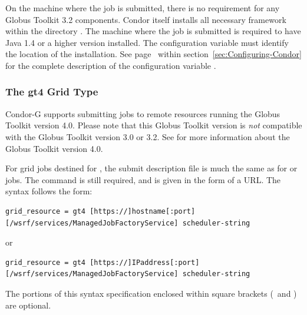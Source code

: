 
On the machine where the job is submitted,
there is no requirement for any Globus Toolkit 3.2 components.
Condor itself installs all necessary framework within the directory 
.
The machine where the job is submitted
is required to
have Java 1.4 or a higher version installed.
The configuration variable 
must identify the location of the installation.
See page~\pageref{param:Java} within
section~\ref{sec:Configuring-Condor}
for the complete description of the configuration variable .


\subsubsection{\label{sec:Using-gt4}The gt4 Grid Type}

Condor-G supports submitting jobs to remote resources running
the Globus Toolkit version 4.0.
Please note that this Globus Toolkit version
is \emph{not} compatible with the Globus Toolkit version 3.0 or 3.2.
See
for more information about the Globus Toolkit version 4.0.

For grid jobs destined for ,
the submit description file is much the same as for
 or  jobs.
The  command is still required,
and is given in the form of a URL. 
The syntax follows the form:
\footnotesize
\begin{verbatim}
grid_resource = gt4 [https://]hostname[:port][/wsrf/services/ManagedJobFactoryService] scheduler-string
\end{verbatim}
\normalsize

or
\footnotesize
\begin{verbatim}
grid_resource = gt4 [https://]IPaddress[:port][/wsrf/services/ManagedJobFactoryService] scheduler-string
\end{verbatim}
\normalsize
The portions of this syntax specification enclosed within
square brackets (\Lbr\ and \Rbr) are optional.

